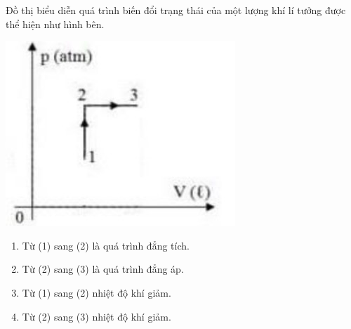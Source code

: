 \begin{ex}
	Đồ thị biểu diễn quá trình biến đổi trạng thái của một lượng khí lí tưởng được thể hiện như hình bên.
	\begin{center}
		\includegraphics[width=0.25\linewidth]{figs/VN12-Y24-PH-SYL-014P-15}
	\end{center}
	\begin{enumerate}[label=\alph*)]
		\item Từ (1) sang (2) là quá trình đẳng tích.
		\item Từ (2) sang (3) là quá trình đẳng áp.
		\item  Từ (1) sang (2) nhiệt độ khí giảm.
		\item Từ (2) sang (3) nhiệt độ khí giảm.
	\end{enumerate}
\end{ex}
